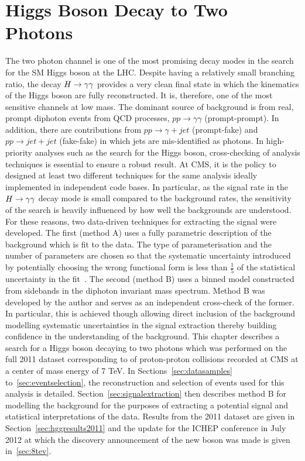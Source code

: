 \chapter{Higgs Boson Decay to Two Photons}
\label{chap:hgg}

The two photon channel is one of the most promising decay modes in 
the search for the SM Higgs boson at the LHC. 
Despite having a relatively small branching ratio, the decay $H\rightarrow\gamma\gamma$ 
provides a very clean final state in which the kinematics of the Higgs boson are 
fully reconstructed. It is, therefore,
one of the most sensitive channels at low mass.
The dominant source of background is from real, prompt diphoton events from QCD 
processes, $pp\rightarrow\gamma\gamma$ (prompt-prompt).
In addition, there are contributions from $pp\rightarrow\gamma+jet$ (prompt-fake) and 
$pp\rightarrow jet+jet$ (fake-fake) in which jets are mis-identified as photons. 
In high-priority analyses such as the search for the Higgs boson, cross-checking of analysis
techniques is essential to ensure a robust result. At CMS, it is the policy to designed at least two 
different techniques for the same analysis ideally implemented in independent code bases.
In particular, as the signal rate in the $H\rightarrow\gamma\gamma$ decay mode is small compared to the background rates,
the sensitivity of the search is heavily influenced by how well the backgrounds are understood.
For these reasons, two data-driven techniques for extracting the signal were developed.
The first (method A) uses a fully parametric description of the background which is fit to the data. 
The type of parameterisation and the number of parameters are chosen so that the systematic uncertainty 
introduced by potentially choosing the wrong functional form is less than $\frac{\displaystyle 1}{\displaystyle 5}$ 
of the statistical uncertainty in the fit~\citep{HIG-11-033}.
The second (method B) uses a binned model constructed from 
sidebands in the diphoton invariant mass spectrum. 
Method B was developed by the author and serves as an independent 
cross-check of the former. In particular, this is achieved though allowing direct 
inclusion of the background modelling systematic uncertainties in the signal extraction thereby building 
confidence in the understanding of the background. 
This chapter describes a search for a Higgs boson decaying to two photons
which was performed on the full 2011 dataset corresponding to \clumi of proton-proton collisions 
recorded at CMS at a center of mass energy of 7 TeV.
In Sections~\ref{sec:datasamples} to~\ref{sec:eventselection}, the reconstruction and
selection of events used for this analysis is detailed. Section~\ref{sec:signalextraction} 
then describes method B for modelling the background for the purposes
of extracting a potential signal and statistical interpretations of the data. 
Results from the 2011 dataset are given in Section~\ref{sec:hggresults2011} and the update for the ICHEP conference in July 2012
at which the discovery announcement of the new boson was made is given in~\ref{sec:8tev}.

